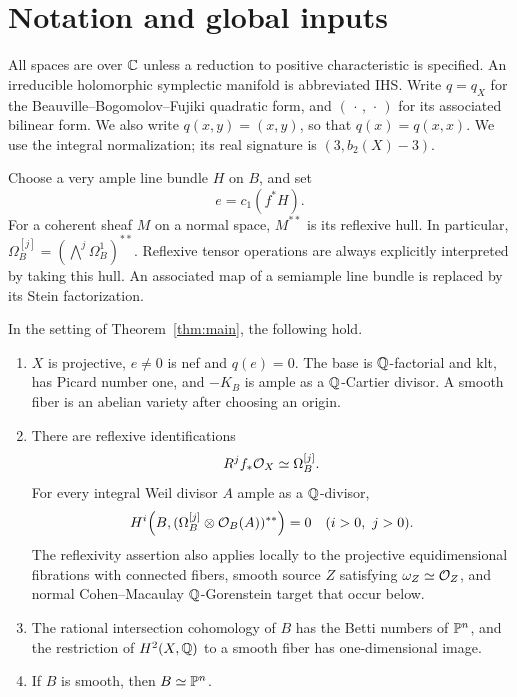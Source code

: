 \section{Notation and global inputs}\label{sec:setup}

All spaces are over $\mathbb C$ unless a reduction to positive characteristic
is specified. An irreducible holomorphic symplectic manifold is
abbreviated IHS. Write $q=q_X$ for the Beauville--Bogomolov--Fujiki
quadratic form, and $(\,\cdot\,,\,\cdot\,)$ for its associated
bilinear form. We also write $q(x,y)=(x,y)$, so that $q(x)=q(x,x)$.
We use the integral normalization; its real signature is
$(3,b_2(X)-3)$.

Choose a very ample line bundle $H$ on $B$, and set
\[
                         e=c_1(f^*H).
\]
For a coherent sheaf $M$ on a normal space, $M^{**}$ is its
reflexive hull. In particular,
$\Omega_B^{[j]}=(\bigwedge^j\Omega_B^1)^{**}$.
Reflexive tensor operations are always explicitly interpreted by
taking this hull. An associated map of a semiample line bundle is
replaced by its Stein factorization.

\begin{proposition}
\label{prop:background}
In the setting of Theorem~\ref{thm:main}, the following hold.
\begin{enumerate}
\item $X$ is projective, $e\neq0$ is nef and $q(e)=0$.
The base is $\mathbb Q$-factorial and klt, has Picard number one,
and $-K_B$ is ample as a $\mathbb Q$-Cartier divisor.
A smooth fiber is an abelian variety after choosing an origin.
\item There are reflexive identifications
\[
                  R^j f_*\mathcal O_X\simeq\Omega_B^{[j]}.
\]
For every integral Weil divisor $A$ ample as a $\mathbb Q$-divisor,
\[
 H^i\!\left(B,
       (\Omega_B^{[j]}\otimes\mathcal O_B(A))^{**}\right)=0
                       \quad(i>0,\ j>0).
\]
The reflexivity assertion also applies locally to the projective
equidimensional fibrations with connected fibers, smooth source \(Z\)
satisfying \(\omega_Z\simeq\mathcal O_Z\), and normal Cohen--Macaulay
\(\mathbb Q\)-Gorenstein target that occur below.
\item The rational intersection cohomology of $B$ has the Betti
numbers of $\mathbb P^n$, and the restriction of $H^2(X,\mathbb Q)$ to a
smooth fiber has one-dimensional image.
\item If $B$ is smooth, then $B\simeq\mathbb P^n$.
\end{enumerate}
\end{proposition}

